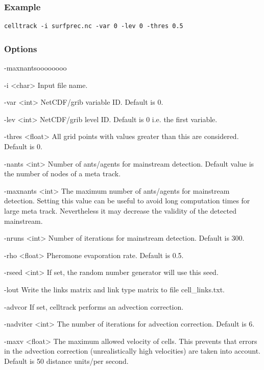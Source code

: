\documentclass{scrartcl}
\begin{document}
\subsubsection*{Example}
\begin{verbatim}
celltrack -i surfprec.nc -var 0 -lev 0 -thres 0.5
\end{verbatim}

\subsubsection*{Options}
\begin{labeling}{-maxnantsoooooooo}
	\item[-i \textless char\textgreater] Input file name.
	\item[-var \textless int\textgreater] NetCDF/grib variable ID. Default is 0.
	\item[-lev \textless int\textgreater] NetCDF/grib level ID. Default is 0 i.e. the first variable.
	\item[-thres \textless float\textgreater] All grid points with values greater than this are considered. Default is 0.
	\item[-nants \textless int\textgreater] Number of ants/agents for mainstream detection. Default value is the number of nodes of a meta track.
	\item[-maxnants \textless int\textgreater] The maximum number of ants/agents for mainstream detection. Setting this value can be useful to avoid long computation times for large meta track. Nevertheless it may decrease the validity of the detected mainstream.
	\item[-nruns \textless int\textgreater] Number of iterations for mainstream detection. Default is 300.
	\item[-rho \textless float\textgreater] Pheromone evaporation rate. Default is 0.5.
	\item[-rseed \textless int\textgreater] If set, the random number generator will use this seed.
    \item[-lout] Write the links matrix and link type matrix to file cell\_links.txt.
    \item[-advcor] If set, celltrack performs an advection correction.
    \item[-nadviter \textless int\textgreater] The number of iterations for advection correction. Default is 6.
    \item[-maxv \textless float\textgreater] The maximum allowed velocity of cells. This prevents that errors in the advection correction (unrealistically high velocities) are taken into account. Default is 50 distance units/per second.

\end{labeling}
\end{document}
